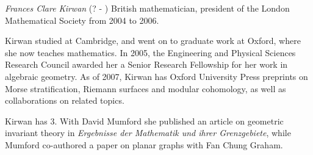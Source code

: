\documentclass[12pt]{article}
\begin{document}
\emph{Frances Clare Kirwan} (? - ) British mathematician, president of the London Mathematical Society from 2004 to 2006.

Kirwan studied at Cambridge, and went on to graduate work at Oxford, where she now teaches mathematics. In 2005, the Engineering and Physical Sciences Research Council awarded her a Senior Research Fellowship for her work in algebraic geometry. As of 2007, Kirwan has Oxford University Press preprints on Morse stratification, Riemann surfaces and modular cohomology, as well as collaborations on related topics.

Kirwan has  3. With David Mumford she published an article on geometric invariant theory in {\it Ergebnisse der Mathematik und ihrer Grenzgebiete}, while Mumford co-authored a paper on planar graphs with Fan Chung Graham.
\end{document}
